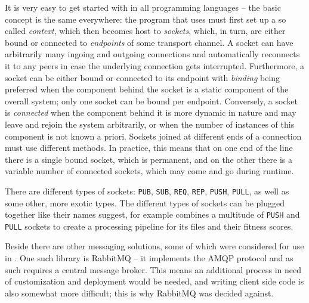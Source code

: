 It is very easy to get started with \zmq in all programming languages -- the basic concept is the
same everywhere: the program that uses \zmq must first set up a so called \emph{context}, which then becomes
host to \emph{sockets}, which, in turn, are either bound or connected to \emph{endpoints} of some transport
channel. A socket can have arbitrarily many ingoing and outgoing connections and \zmq automatically reconnects
it to any peers in case the underlying connection gets interrupted. Furthermore, a socket can be either bound
or connected to its endpoint with \emph{binding} being preferred when the component behind the socket is a
static component of the overall system; only one socket can be bound per endpoint. Conversely, a socket is
\emph{connected} when the component behind it is more dynamic in nature and may leave and rejoin the system
arbitrarily, or when the number of instances of this component is not known a priori. Sockets joined at
different ends of a connection must use different methods. In practice, this means that on one end of the line
there is a single bound socket, which is permanent, and on the other there is a variable number of connected
sockets, which may come and go during runtime.

There are different types of sockets: \texttt{PUB}, \texttt{SUB}, \texttt{REQ}, \texttt{REP}, \texttt{PUSH}, 
\texttt{PULL}, as well as some other, more exotic types. The different types of sockets can be plugged together
like their names suggest, for example \xmlmate combines a multitude of \texttt{PUSH} and \texttt{PULL} sockets
to create a processing pipeline for its \xml files and their fitness scores.

Beside \zmq there are other messaging solutions, some of which were considered for use in \xmlmate. One such
library is {\small RabbitMQ}\cite{rabbitmq} -- it implements the AMQP protocol and as such requires a central
message broker. This means an additional process in need of customization and deployment would be needed, and
writing client side code is also somewhat more difficult; this is why {\small RabbitMQ} was decided against.

